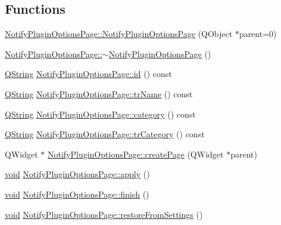 \subsection*{Functions}
\begin{DoxyCompactItemize}
\item 
\hyperlink{group__notify_gaf584594e769010fbcdb1feb54b94eaab}{Notify\-Plugin\-Options\-Page\-::\-Notify\-Plugin\-Options\-Page} (Q\-Object $\ast$parent=0)
\item 
\hyperlink{group__notify_ga3dfd084ec6b7b9f55aeb3a5c475b11d7}{Notify\-Plugin\-Options\-Page\-::$\sim$\-Notify\-Plugin\-Options\-Page} ()
\item 
\hyperlink{group___u_a_v_objects_plugin_gab9d252f49c333c94a72f97ce3105a32d}{Q\-String} \hyperlink{group__notify_ga9528eeaab32e5a6696eb4e82c7dda847}{Notify\-Plugin\-Options\-Page\-::id} () const 
\item 
\hyperlink{group___u_a_v_objects_plugin_gab9d252f49c333c94a72f97ce3105a32d}{Q\-String} \hyperlink{group__notify_ga156b37b99e34d9b0e865f57efaa55f3c}{Notify\-Plugin\-Options\-Page\-::tr\-Name} () const 
\item 
\hyperlink{group___u_a_v_objects_plugin_gab9d252f49c333c94a72f97ce3105a32d}{Q\-String} \hyperlink{group__notify_ga1a0c17416e10df677d14565330619cfb}{Notify\-Plugin\-Options\-Page\-::category} () const 
\item 
\hyperlink{group___u_a_v_objects_plugin_gab9d252f49c333c94a72f97ce3105a32d}{Q\-String} \hyperlink{group__notify_ga963ad76e88d1a3737bd5d12e493c214a}{Notify\-Plugin\-Options\-Page\-::tr\-Category} () const 
\item 
Q\-Widget $\ast$ \hyperlink{group__notify_gaab5b02bf851c75f0476a29cc59bde9ae}{Notify\-Plugin\-Options\-Page\-::create\-Page} (Q\-Widget $\ast$parent)
\item 
\hyperlink{group___u_a_v_objects_plugin_ga444cf2ff3f0ecbe028adce838d373f5c}{void} \hyperlink{group__notify_gae0ac041ae8505afd88f981a6ac235fe7}{Notify\-Plugin\-Options\-Page\-::apply} ()
\item 
\hyperlink{group___u_a_v_objects_plugin_ga444cf2ff3f0ecbe028adce838d373f5c}{void} \hyperlink{group__notify_gaa13ff08a62eca11b672d5f7d88fa7c40}{Notify\-Plugin\-Options\-Page\-::finish} ()
\item 
\hyperlink{group___u_a_v_objects_plugin_ga444cf2ff3f0ecbe028adce838d373f5c}{void} \hyperlink{group__notify_ga2607c7c5d3db72401fe48f07838d36ce}{Notify\-Plugin\-Options\-Page\-::restore\-From\-Settings} ()
\end{DoxyCompactItemize}
